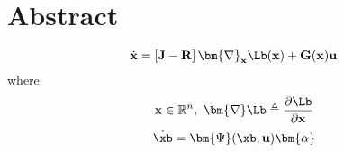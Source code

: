 \chapter*{Abstract}
\label{abst}

$$\dot{\mathbf{x}} = \left[\mathbf{J}-\mathbf{R}\right]\bm{\nabla}_\mathbf{x}\Lb(\mathbf{x})+\mathbf{G}(\mathbf{x})\mathbf{u}$$
where 
\[\mathbf{x}\in\mathbb{R}^n,~\bm{\nabla}\Lb\triangleq\frac{\partial \Lb}{\partial \mathbf{x}}\]
\[\dot{\xb} = \bm{\Psi}(\xb,\mathbf{u})\bm{\alpha}\]
%
%
%
